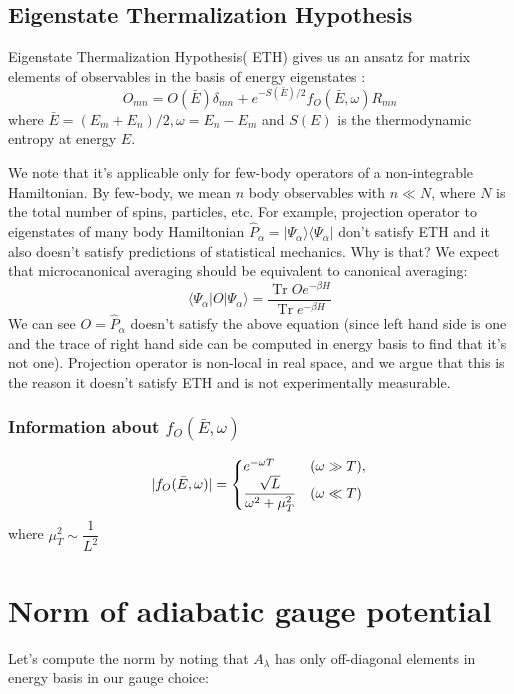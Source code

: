 \documentclass[11pt,a4paper]{article}
\DeclareMathOperator{\Tr}{Tr}
\begin{document}
\subsection{Eigenstate Thermalization Hypothesis}
Eigenstate Thermalization Hypothesis( ETH) gives us an ansatz for matrix elements of observables in the basis of energy eigenstates  \cite{d2016quantum}:
\begin{equation}
O_{mn}= O( \bar{E}) \delta_{mn} + e^{-S(\bar{E})/2} f_O(\bar{E}, \omega) R_{mn}
\end{equation}
where $\bar{E}= (E_m +E_n)/2, \omega= E_n- E_m$ and $S(E)$ is the thermodynamic entropy at energy $E$.

We note that it's applicable only for few-body operators of a non-integrable Hamiltonian. By few-body, we mean $n$ body observables with $n \ll N$, where $N$ is the total number of spins, particles, etc. For example, projection operator to eigenstates of many body  Hamiltonian $\hat{P}_{\alpha}= |\Psi_{\alpha} \rangle \langle\Psi_{\alpha}  |$ don't satisfy ETH and it also doesn't satisfy predictions of statistical mechanics. Why is that? We expect that microcanonical averaging should be equivalent to canonical averaging:
\begin{equation}
 \langle\Psi_{\alpha}  |O|\Psi_{\alpha} \rangle= \dfrac{\Tr O e^{-\beta H}}{\Tr e^{-\beta H}}
\end{equation}
We can see $O= \hat{P}_{\alpha}$ doesn't satisfy the above equation (since left hand side is one and the trace of right hand side can be computed in energy basis to find that it's not one). Projection operator is non-local in real space, and we argue that this is the reason it doesn't satisfy ETH and is not experimentally measurable.

\subsubsection{Information about $f_O(\bar{E}, \omega)$}

\begin{equation}
 |f_O(\bar{E}, \omega)|=\left\{
  \begin{array}{@{}ll@{}}
    e^{-\omega T} & (\omega \gg T), \\
     \dfrac{\sqrt{L}}{\omega^2+ \mu_T^2} & (\omega \ll T)
  \end{array}\right.
\end{equation}
where $\mu_T^2 \sim \dfrac{1}{L^2}$ \cite{khatami2013fluctuation, srednicki1999approach,d2016quantum}
\section{Norm of adiabatic gauge potential}
Let's compute the norm by noting that $A_{\lambda}$ has only off-diagonal elements in energy basis in our gauge choice:
\end{document}
